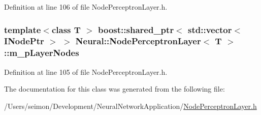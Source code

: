 Definition at line 106 of file NodePerceptronLayer.h.

\hypertarget{class_neural_1_1_node_perceptron_layer_a9439fce206cbf489b864f4c8818c32e5}{
\subsubsection[{m\_\-pLayerNodes}]{\setlength{\rightskip}{0pt plus 5cm}template$<$class T $>$ boost::shared\_\-ptr$<$ std::vector$<$ {\bf INodePtr} $>$ $>$ {\bf Neural::NodePerceptronLayer}$<$ T $>$::{\bf m\_\-pLayerNodes}}}
\label{class_neural_1_1_node_perceptron_layer_a9439fce206cbf489b864f4c8818c32e5}


Definition at line 105 of file NodePerceptronLayer.h.



The documentation for this class was generated from the following file:\begin{DoxyCompactItemize}
\item 
/Users/seimon/Development/NeuralNetworkApplication/\hyperlink{_node_perceptron_layer_8h}{NodePerceptronLayer.h}\end{DoxyCompactItemize}
